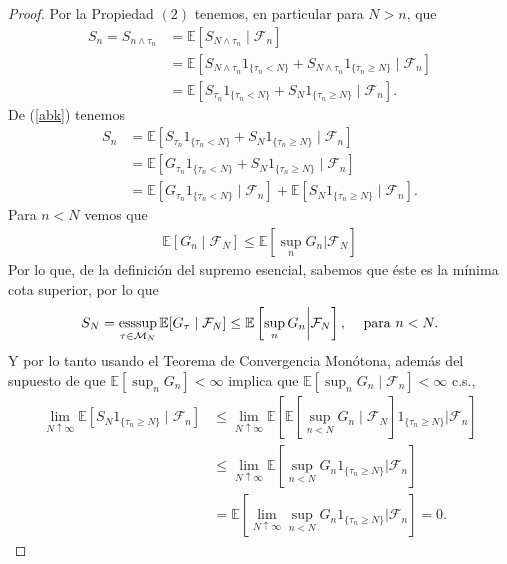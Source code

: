 \begin{proof}
Por la Propiedad $(2)$ tenemos, en particular para $N > n$, que
	\begin{align*}
	S_n = S_{n \wedge \tau_n} & = \mathbb{E}[S_{N \wedge \tau_n} \mid \mathcal{F}_n] \\
	& = \mathbb{E}[S_{N \wedge \tau_n} 1_{\{\tau_n < N\}} + S_{N \wedge \tau_n} 1_{\{\tau_n \geq N\}} \mid \mathcal{F}_n] \\
	& = \mathbb{E}[S_{\tau_n} 1_{\{\tau_n < N\}} + S_N 1_{\{\tau_n \geq N\}} \mid \mathcal{F}_n].
	\end{align*}
De (\ref{abk}) tenemos 
	\begin{align}
	S_n & = \mathbb{E}[S_{\tau_n} 1_{\{\tau_n < N\}} + S_N 1_{\{\tau_n \geq N\}} \mid \mathcal{F}_n] \nonumber \\
	& = \mathbb{E}[G_{\tau_n} 1_{\{\tau_n < N\}} + S_N 1_{\{\tau_n \geq N\}} \mid \mathcal{F}_n] \nonumber \\ 
	& = \mathbb{E}[G_{\tau_n} 1_{\{\tau_n < N\}} \mid \mathcal{F}_n] + \mathbb{E}[S_N 1_{\{\tau_n \geq N\}} \mid \mathcal{F}_n]. \label{abl}
	\end{align}
Para $n < N$ vemos que
	\begin{align*}
	\mathbb{E}[G_n \mid \mathcal{F}_N] \leq \mathbb{E} \left[ \sup_n G_n \bigg | \mathcal{F}_N \right]
	\end{align*}
Por lo que, de la definición del supremo esencial, sabemos que éste es la mínima cota superior, por lo que
	\begin{align*}
	S_N = \operatorname*{esssup}_{\tau \in \mathcal{M}_N} \mathbb{E}[G_\tau \mid \mathcal{F}_N] \leq \mathbb{E}\left[\sup_n G_n \bigg | \mathcal{F}_N \right], \hspace{0.3cm} \text{ para } n < N.
	\end{align*}
Y por lo tanto usando el Teorema de Convergencia Monótona, además del supuesto de que $\mathbb{E}[\sup_n G_n] < \infty$ implica que $\mathbb{E}[\sup_n G_n \mid \mathcal{F}_n] < \infty$ c.s., 
	\begin{align}
	\lim_{N \uparrow \infty} \mathbb{E}[S_N 1_{\{\tau_n \geq N\}} \mid \mathcal{F}_n] & \leq \lim_{N \uparrow \infty} \mathbb{E} \left[ \mathbb{E} \left[ \sup_{n < N} G_n  \mid \mathcal{F}_N \right] 1_{\{\tau_n \geq N\}} \bigg | \mathcal{F}_n \right] \nonumber \\
	& \leq \lim_{N \uparrow \infty} \mathbb{E}\left[\sup_{n < N} G_n 1_{\{\tau_n \geq N\}} \bigg | \mathcal{F}_n\right] \\
	& = \mathbb{E} \left[ \lim_{N \uparrow \infty} \sup_{n < N} G_n 1_{\{\tau_n \geq N\}} \bigg | \mathcal{F}_n \right] = 0. \label{abm}

\end{align}
\end{proof}
